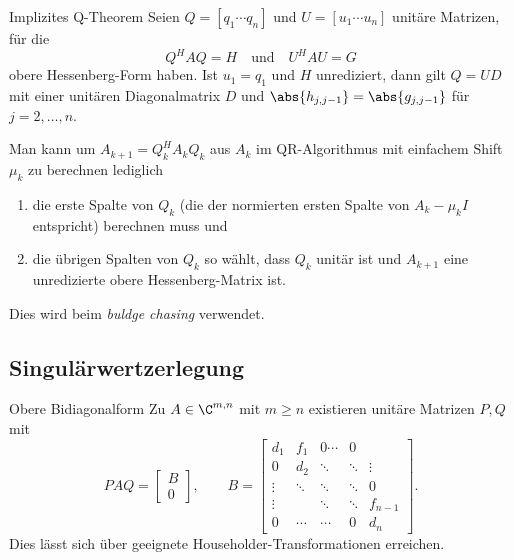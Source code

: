 \begin{karte}{Implizites Q-Theorem}
    Seien \( Q = [q_1 \cdots q_n] \) und \(U = [u_1 \cdots u_n]\) 
    unitäre Matrizen, für die 
    \[ Q^H A Q = H \quad \text{und} \quad U^H A U = G \] 
    obere Hessenberg-Form haben. 
    Ist \( u_1 = q_1 \) und \(H\) unrediziert, dann gilt 
    \( Q = UD \) mit einer unitären Diagonalmatrix \(D\) und 
    \( \abs{h_{j,j-1}} = \abs{g_{j,j-1}} \) für \( j= 2,\ldots, n \).

    Man kann um \( A_{k+1} = Q_k^H A_k Q_k \) aus \(A_k\) 
    im QR-Algorithmus mit einfachem Shift \(\mu_k\) zu berechnen 
    lediglich 
    \begin{enumerate}
        \item die erste Spalte von \( Q_k \) (die der normierten ersten Spalte von \(A_k - \mu_k I\) entspricht) 
        berechnen muss und 
        \item die übrigen Spalten von \( Q_k \) so wählt, dass \(Q_k\) unitär ist und \( A_{k+1} \) eine unredizierte obere Hessenberg-Matrix ist.
    \end{enumerate}
    Dies wird beim \textit{buldge chasing} verwendet.
\end{karte}

\subsection{Singulärwertzerlegung}

\begin{karte}{Obere Bidiagonalform}
    Zu \( A\in \C^{m,n} \) mit \( m\geq n \) existieren unitäre 
    Matrizen \( P, Q \) mit 
    \[ PAQ = \left[ \begin{matrix}
        B \\ 0
    \end{matrix} \right], \qquad B = \left[ \begin{matrix}
        d_1 & f_1 & 0 \cdots & 0 \\
        0 & d_2 & \ddots & \ddots & \vdots \\
        \vdots & \ddots & \ddots & \ddots & 0 \\
        \vdots & & \ddots & \ddots & f_{n-1} \\
        0 & \cdots & \cdots & 0 & d_n
    \end{matrix} \right]. \]
    Dies lässt sich über geeignete Householder-Transformationen erreichen.
\end{karte}

